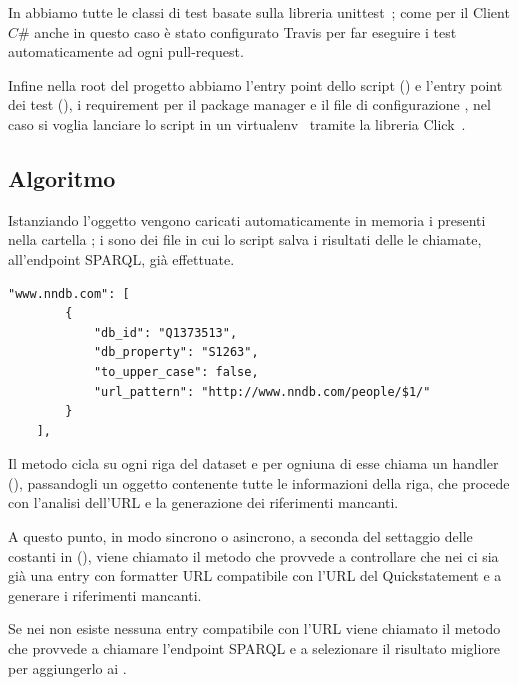 In  abbiamo tutte le classi di test basate sulla libreria unittest~\cite{unittest}; come per il Client $C\#$ anche in questo caso è stato configurato Travis per far eseguire i test 
automaticamente ad ogni pull-request. 

Infine nella root del progetto abbiamo l'entry point dello script () e l'entry point dei test (), i requirement per il package manager 
e il file di configurazione , nel caso si voglia lanciare lo script in un virtualenv~\cite{virtualenv} tramite la libreria Click~\cite{click}.

\subsection{Algoritmo}
Istanziando l'oggetto  vengono caricati automaticamente in memoria i  presenti nella cartella ; 
i  sono dei file  in cui lo script salva i risultati delle le chiamate, all'endpoint SPARQL, già effettuate.

\begin{lstlisting}[style=jsonStyle, caption=Some Code]
    "www.nndb.com": [
        {
            "db_id": "Q1373513", 
            "db_property": "S1263", 
            "to_upper_case": false, 
            "url_pattern": "http://www.nndb.com/people/$1/"
        }
    ], 
\end{lstlisting}

Il metodo  cicla su ogni riga del dataset e per ogniuna di esse chiama un handler 
(), passandogli un oggetto  contenente tutte le informazioni della riga, 
che procede con l'analisi dell'URL e la generazione dei riferimenti mancanti.

A questo punto, in modo sincrono o asincrono, a seconda del settaggio delle costanti in  (), 
viene chiamato il metodo  che provvede a controllare che nei  ci sia già una entry con formatter URL compatibile 
con l'URL del Quickstatement e a generare i riferimenti mancanti.

Se nei  non esiste nessuna entry compatibile con l'URL viene chiamato il metodo  che provvede a chiamare l'endpoint SPARQL 
e a selezionare il risultato migliore per aggiungerlo ai . 


